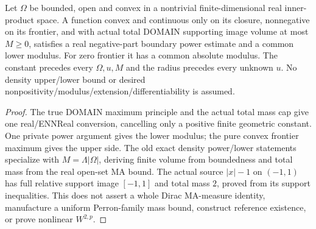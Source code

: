 \begin{lemma}
  \label{lem:domain-ma-total-boundary}
  \leanok
  Let $\Omega$ be bounded, open and convex in a nontrivial finite-dimensional
  real inner-product space. A function convex and continuous only on its
  closure, nonnegative on its frontier, and with actual total DOMAIN supporting
  image volume at most $M\ge0$, satisfies a real negative-part boundary power
  estimate and a common lower modulus. For zero frontier it has a common
  absolute modulus. The constant precedes every $\Omega,u,M$ and the radius
  precedes every unknown $u$. No density upper/lower bound or desired
  nonpositivity/modulus/extension/differentiability is assumed.
\end{lemma}
\begin{proof}
  \leanok
  The true DOMAIN maximum principle and the actual total mass cap give one
  real/ENNReal conversion, cancelling only a positive finite geometric constant.
  One private power argument gives the lower modulus; the pure convex frontier
  maximum gives the upper side. The old exact density power/lower statements
  specialize with $M=\Lambda|\Omega|$, deriving finite volume from boundedness
  and total mass from the real open-set MA bound. The actual source $|x|-1$
  on $(-1,1)$ has full relative support image $[-1,1]$ and total mass $2$,
  proved from its support inequalities. This does not assert a whole Dirac
  MA-measure identity, manufacture a uniform Perron-family mass bound, construct
  reference existence, or prove nonlinear $W^{2,p}$.
\end{proof}

